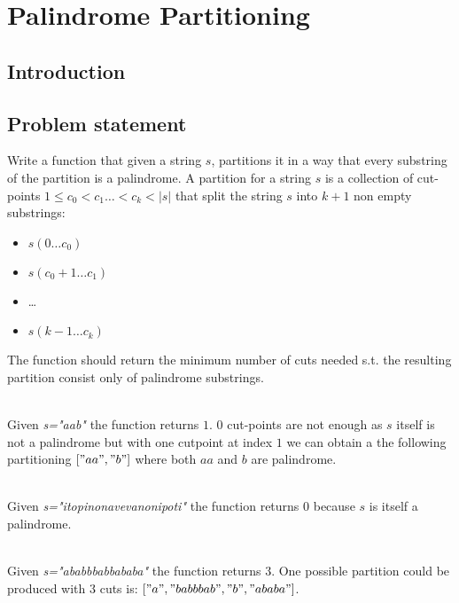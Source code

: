 %

\chapter{Palindrome Partitioning }
\label{ch:palindrome_partitioning2}
\section*{Introduction}

\section{Problem statement}
\begin{exercise}
Write a function that given a string $s$, partitions it in a way that every substring of the
partition is a palindrome. A partition for a string $s$ is a collection of cut-points $1 \leq c_0 <
c_1 \ldots < c_k < |s|$ that split the string $s$ into $k+1$ non empty substrings:
\begin{itemize}
	\item $s(0 \ldots c_0)$
	\item $s(c_0+1 \ldots c_1)$
	\item \ldots
	\item $s(k-1 \ldots c_k)$
\end{itemize}
The function should return the minimum number of cuts needed s.t. the resulting partition consist
only of palindrome substrings.

\begin{example}
		\hfill \\
		Given \textit{s="aab"} the function returns $1$. $0$ cut-points are not enough as $s$ itself
		is not a palindrome but with one cutpoint at index $1$ we can obtain a the following
		partitioning $["aa","b"]$ where both $aa$ and $b$ are palindrome. 
	\end{example}

	\begin{example}
		\hfill \\
		Given \textit{s="itopinonavevanonipoti"} the function returns $0$ because $s$ is itself a
		palindrome. 
	\end{example}

	\begin{example}
		\hfill \\
		Given \textit{s="ababbbabbababa"} the function returns $3$. One possible partition could be
		produced with $3$ cuts is: $["a","babbbab","b","ababa"]$.
	\end{example}
\end{exercise}
